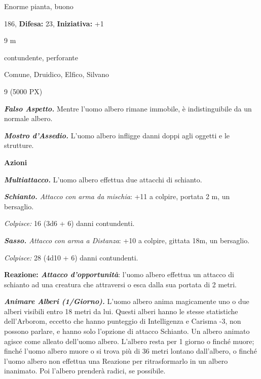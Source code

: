 \begin{multicols}{2}
{
\noindent
\begin{description}[noitemsep, topsep=0pt, parsep=0pt, partopsep=0pt, leftmargin=0cm, labelwidth=2.2cm]
	\item[\textbf{Taglia/Tipo:}] Enorme pianta, buono
	\item[\textbf{Caratt.:}] 
	\item[\textbf{Punti Ferita:}] 186,  \textbf{Difesa:} 23,  \textbf{Iniziativa:} +1
	\item[\textbf{Movimento:}] 9 m
	\item[\textbf{Tiri Salvez.:}] 
	\item[\textbf{Res. Danni:}] contundente, perforante
	\item[\textbf{Linguaggi:}] Comune, Druidico, Elfico, Silvano
	\item[\textbf{Sfida:}] 9 (5000 PX)\smallskip
\end{description}

\emph{\textbf{Falso Aspetto.}} Mentre l'uomo albero rimane immobile, è indistinguibile da un normale albero.

\emph{\textbf{Mostro d'Assedio.}} L'uomo albero infligge danni doppi agli oggetti e le strutture.

\textbf{Azioni}

\emph{\textbf{Multiattacco.}} L'uomo albero effettua due attacchi di schianto.

\emph{\textbf{Schianto.} Attacco con arma da mischia}: +11 a colpire, portata 2 m, un bersaglio.

\emph{Colpisce:} 16 (3d6 + 6) danni contundenti.

\emph{\textbf{Sasso.} Attacco con arma a Distanza}: +10 a colpire, gittata 18m, un bersaglio.

\emph{Colpisce:} 28 (4d10 + 6) danni contundenti.

\textbf{Reazione: \emph{Attacco d'opportunità}}: l'uomo albero effettua un attacco di schianto ad una creatura che attraversi o esca dalla sua portata di 2 metri.

\emph{\textbf{Animare Alberi (1/Giorno).}} L'uomo albero anima magicamente uno o due alberi visibili entro 18 metri da lui. Questi alberi hanno le stesse statistiche dell'Arborom, eccetto che hanno punteggio di Intelligenza e Carisma -3, non possono parlare, e hanno solo l'opzione di attacco Schianto. Un albero animato agisce come alleato dell'uomo albero. L'albero resta per 1 giorno o finché muore; finché l'uomo albero muore o si trova più di 36 metri lontano dall'albero, o finché l'uomo albero non effettua una Reazione per ritrasformarlo in un albero inanimato. Poi l'albero prenderà radici, se possibile.

}
\end{multicols}
